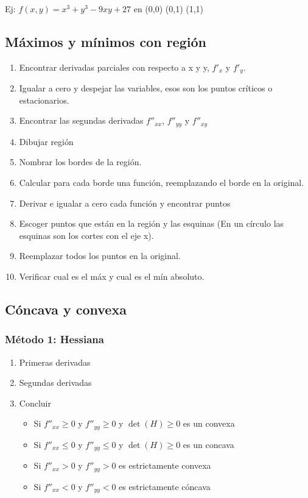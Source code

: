 Ej: $f(x,y)=x^3+y^3-9xy+27$ en (0,0) (0,1) (1,1)

\subsection{Máximos y mínimos con región}

\begin{enumerate}
	\item Encontrar derivadas parciales con respecto a x y y, $f'_{x}$ y $f'_{y}$.
	\item Igualar a cero y despejar las variables, esos son los puntos críticos o estacionarios.
	\item Encontrar las segundas derivadas $f''_{xx}$, $f''_{yy}$ y $f''_{xy}$
	\item Dibujar región
	\item Nombrar los bordes de la región.
	\item Calcular para cada borde una función, reemplazando el borde en la original.
	\item Derivar e igualar a cero cada función y encontrar puntos
	\item Escoger puntos que están en la región y las esquinas (En un círculo las esquinas son los cortes con el eje x).
	\item Reemplazar todos los puntos en la original.
	\item Verificar cual es el máx y cual es el mín absoluto. 
\end{enumerate}

\subsection{Cóncava y convexa}
\subsubsection{Método 1: Hessiana}
\begin{enumerate}
	\item Primeras derivadas
	\item Segundas derivadas
	\item Concluir
	\begin{itemize}
		\item Si $f''_{xx}\geq0$ y $f''_{yy}\geq0$ y $\det(H)\geq0$ es un convexa
		\item Si $f''_{xx}\leq0$ y $f''_{yy}\leq0$ y $\det(H)\geq0$ es un concava
		\item Si $f''_{xx}>0$ y $f''_{yy}>0$ es estrictamente convexa
		\item Si $f''_{xx}<0$ y $f''_{yy}<0$ es estrictamente cóncava
	\end{itemize}
\end{enumerate}

